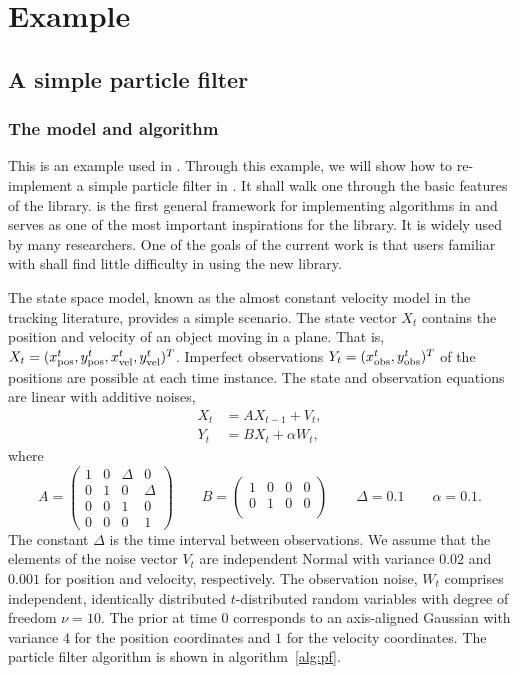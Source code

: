 \documentclass[11pt, bib, hyper, mint, minted=cache]{marticle}
\begin{document}
\section{Example}
\label{sec:Example}

\subsection{A simple particle filter}
\label{sub:A simple particle filter}

\subsubsection{The model and algorithm}

This is an example used in \lsmctc \parencite{smctc}. Through this example, we
will show how to re-implement a simple particle filter in \vsmc. It shall walk
one through the basic features of the library. \lsmctc is the first general
framework for implementing \smc algorithms in \cpp and serves as one of the
most important inspirations for the \vsmc library. It is widely used by many
researchers. One of the goals of the current work is that users familiar with
\lsmctc shall find little difficulty in using the new library.

The state space model, known as the almost constant velocity model in the
tracking literature, provides a simple scenario. The state vector $X_t$
contains the position and velocity of an object moving in a plane. That is,
$X_t = (x_{\mathrm{pos}}^t, y_{\mathrm{pos}}^t, x_{\mathrm{vel}}^t, y_{\mathrm{vel}}^t)^T$. Imperfect observations $Y_t =
(x_{\mathrm{obs}}^t, y_{\mathrm{obs}}^t)^T$ of the positions are possible at each time instance. The
state and observation equations are linear with additive noises,
\begin{align*}
  X_t &= AX_{t-1} + V_t, \\
  Y_t &= BX_t + \alpha W_t,
\end{align*}
where
\begin{equation*}
  A = \begin{pmatrix}
    1 & 0 & \Delta & 0 \\
    0 & 1 & 0 & \Delta \\
    0 & 0 & 1 & 0 \\
    0 & 0 & 0 & 1
  \end{pmatrix} \qquad
  B = \begin{pmatrix}
    1 & 0 & 0 & 0 \\
    0 & 1 & 0 & 0 \\
  \end{pmatrix} \qquad
  \Delta = 0.1 \qquad
  \alpha = 0.1.
\end{equation*}
The constant $\Delta$ is the time interval between observations. We assume
that the elements of the noise vector $V_t$ are independent Normal with
variance $0.02$ and $0.001$ for position and velocity, respectively. The
observation noise, $W_t$ comprises independent, identically distributed
$t$-distributed random variables with degree of freedom $\nu = 10$. The prior
at time $0$ corresponds to an axis-aligned Gaussian with variance $4$ for the
position coordinates and $1$ for the velocity coordinates. The particle filter
algorithm is shown in algorithm~\ref{alg:pf}.
\end{document}
